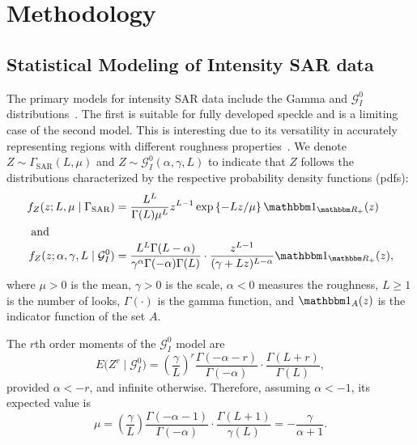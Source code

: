 \chapter{Methodology} \label{chp:methods}

\section{Statistical Modeling of Intensity SAR
data}\label{statistical-modeling-of-intensity-sar-data}

The primary models for intensity SAR data include the Gamma and
\(\mathcal{G}_I^0\) distributions~\citep{Frery1997}. The first is
suitable for fully developed speckle and is a limiting case of the
second model. This is interesting due to its versatility in accurately
representing regions with different roughness
properties~\citep{Cassetti2022}. We denote
\(Z \sim \Gamma_{\text{SAR}}(L, \mu)\) and
\(Z \sim \mathcal{G}_I^0(\alpha, \gamma, L)\) to indicate that \(Z\)
follows the distributions characterized by the respective probability
density functions (pdfs): \begin{align}
    f_Z(z;L, \mu\mid \Gamma_{\text{SAR}})&=\frac{L^L}{\Gamma(L)\mu^L}z^{L-1}\exp\left\{-Lz/\mu\right\} \mathbbm 1_{\mathbbm R_+}(z)\label{E:gamma1}\\
    \intertext{ and }
    f_Z(z; \alpha, \gamma, L \mid \mathcal{G}_I^0)&=\frac{L^L\Gamma(L-\alpha)}{\gamma^{\alpha}\Gamma(-\alpha)\Gamma(L)}\cdot\frac{z^{L-1}}{(\gamma+Lz)^{L-\alpha}} \mathbbm 1_{\mathbbm R_+}(z),\label{E:gi01}
\end{align} where \(\mu > 0\) is the mean, \(\gamma > 0\) is the scale,
\(\alpha < 0\) measures the roughness, \(L \geq 1\) is the number of
looks, \(\Gamma(\cdot)\) is the gamma function, and
\(\mathbbm 1_{A}(z)\) is the indicator function of the set \(A\).

The \(r\)th order moments of the \(\mathcal{G}_I^0\) model are
\begin{equation}
E\big(Z^r\mid \mathcal{G}_I^0\big)  = \left(\frac{\gamma}{L}\right)^r\frac{\Gamma(-\alpha-r)}{\Gamma(-\alpha)}\cdot\frac{\Gamma(L+r)}{\Gamma(L)}, 
    \label{E:rmom}
\end{equation} provided \(\alpha <-r\), and infinite otherwise.
Therefore, assuming \(\alpha<-1\), its expected value is
\begin{equation}
    \mu=\left(\frac{\gamma}{L}\right)\frac{\Gamma(-\alpha-1)}{\Gamma(-\alpha)}\cdot\frac{\Gamma(L+1)}{\gamma(L)}=-\frac{\gamma}{\alpha+1}.
\end{equation}

